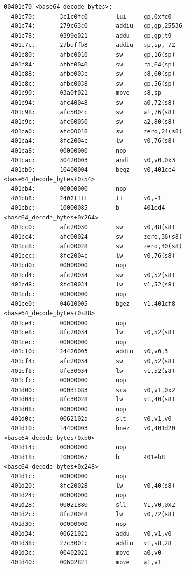 \documentclass[11pt]{article}
\begin{document}
\begin{verbatim}
00401c70 <base64_decode_bytes>:
  401c70:       3c1c0fc0        lui     gp,0xfc0
  401c74:       279c63c0        addiu   gp,gp,25536
  401c78:       0399e021        addu    gp,gp,t9
  401c7c:       27bdffb8        addiu   sp,sp,-72
  401c80:       afbc0010        sw      gp,16(sp)
  401c84:       afbf0040        sw      ra,64(sp)
  401c88:       afbe003c        sw      s8,60(sp)
  401c8c:       afbc0038        sw      gp,56(sp)
  401c90:       03a0f021        move    s8,sp
  401c94:       afc40048        sw      a0,72(s8)
  401c98:       afc5004c        sw      a1,76(s8)
  401c9c:       afc60050        sw      a2,80(s8)
  401ca0:       afc00018        sw      zero,24(s8)
  401ca4:       8fc2004c        lw      v0,76(s8)
  401ca8:       00000000        nop
  401cac:       30420003        andi    v0,v0,0x3
  401cb0:       10400004        beqz    v0,401cc4 <base64_decode_bytes+0x54>
  401cb4:       00000000        nop
  401cb8:       2402ffff        li      v0,-1
  401cbc:       10000085        b       401ed4 <base64_decode_bytes+0x264>
  401cc0:       afc20030        sw      v0,48(s8)
  401cc4:       afc00024        sw      zero,36(s8)
  401cc8:       afc00028        sw      zero,40(s8)
  401ccc:       8fc2004c        lw      v0,76(s8)
  401cd0:       00000000        nop
  401cd4:       afc20034        sw      v0,52(s8)
  401cd8:       8fc30034        lw      v1,52(s8)
  401cdc:       00000000        nop
  401ce0:       04610005        bgez    v1,401cf8 <base64_decode_bytes+0x88>
  401ce4:       00000000        nop
  401ce8:       8fc20034        lw      v0,52(s8)
  401cec:       00000000        nop
  401cf0:       24420003        addiu   v0,v0,3
  401cf4:       afc20034        sw      v0,52(s8)
  401cf8:       8fc30034        lw      v1,52(s8)
  401cfc:       00000000        nop
  401d00:       00031083        sra     v0,v1,0x2
  401d04:       8fc30028        lw      v1,40(s8)
  401d08:       00000000        nop
  401d0c:       0062102a        slt     v0,v1,v0
  401d10:       14400003        bnez    v0,401d20 <base64_decode_bytes+0xb0>
  401d14:       00000000        nop
  401d18:       10000067        b       401eb8 <base64_decode_bytes+0x248>
  401d1c:       00000000        nop
  401d20:       8fc20028        lw      v0,40(s8)
  401d24:       00000000        nop
  401d28:       00021880        sll     v1,v0,0x2
  401d2c:       8fc20048        lw      v0,72(s8)
  401d30:       00000000        nop
  401d34:       00621021        addu    v0,v1,v0
  401d38:       27c3001c        addiu   v1,s8,28
  401d3c:       00402021        move    a0,v0
  401d40:       00602821        move    a1,v1

\end{verbatim}
\end{document}
